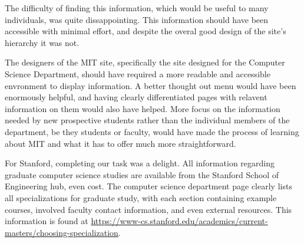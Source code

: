 The difficulty of finding this information, which would be useful to many individuals, was
quite dissappointing. This information should have been accessible with minimal effort, and
despite the overal good design of the site's hierarchy it was not.

The designers of the MIT site, specifically the site designed for the Computer Science Department,
should have required a more readable and accessible envronment to display information. A better
thought out menu would have been enormously helpful, and having clearly differentiated pages with
relavent information on them would also have helped. More focus on the information needed by new
prospective students rather than the individual members of the department, be they students or
faculty, would have made the process of learning about MIT and what it has to offer much more
straightforward.

For Stanford, completing our task was a delight. All information regarding
graduate computer science studies are available from the Stanford School of
Engineering hub, even cost. The computer science department page clearly lists
all specializations for graduate study, with each section containing example
courses, involved faculty contact information, and even external resources. This
information is found at
\url{https://www-cs.stanford.edu/academics/current-masters/choosing-specialization}.

